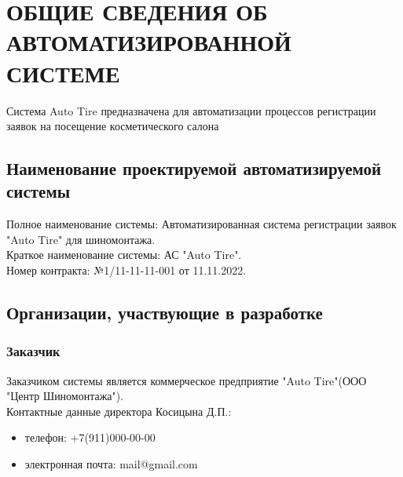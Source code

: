 \documentclass[russian, utf8, 12pt,pointsubsection,floatsubsection]{eskdtext}
\begin{document}
	\maketitle 

	\scriptsize
	\setcounter{tocdepth}{4}
	\tableofcontents
	\normalsize
	\newpage
	
 
\section{ОБЩИЕ СВЕДЕНИЯ ОБ АВТОМАТИЗИРОВАННОЙ СИСТЕМЕ} 

Система Auto Tire предназначена для автоматизации процессов регистрации заявок на
посещение косметического салона
\subsection{Наименование проектируемой автоматизируемой системы}
Полное наименование системы: Автоматизированная система регистрации заявок "Auto Tire" для шиномонтажа.\\

Краткое наименование системы: АС "Auto Tire".\\

Номер контракта: №1/11-11-11-001 от 11.11.2022.\\
\subsection{Организации, участвующие в разработке}
\subsubsection{Заказчик}
Заказчиком системы является коммерческое предприятие "Auto Tire"(ООО "Центр Шиномонтажа").\\
Контактные данные директора Косицына Д.П.: 
\begin{itemize}
    \item телефон: +7(911)000-00-00 
    \item электронная почта: mail@gmail.com
\end{itemize}
\end{document}
